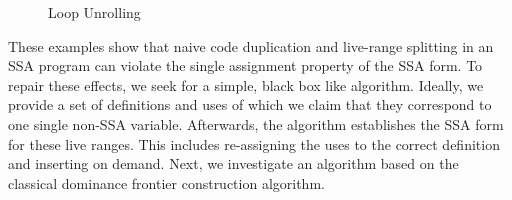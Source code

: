 \begin{figure}[htbp]
	\begin{center}
		\hfill
		\hfill
	\end{center}
	\caption{Loop Unrolling}
	\label{fig:unroll}
\end{figure}

These examples show that naive code duplication and live-range splitting in an SSA program can violate the single assignment property of the SSA form.
To repair these effects, we seek for a simple, black box like algorithm.
Ideally, we provide a set of definitions and uses of which we claim that they correspond to one single non-SSA variable.
Afterwards, the algorithm establishes the SSA form for these live ranges.
This includes re-assigning the uses to the correct definition and inserting \phifuns on demand.
Next, we investigate an algorithm based on the classical dominance frontier construction algorithm.


